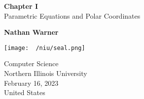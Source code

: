 \documentclass{report}
\title{\Huge{}}
\author{\huge{Nathan Warner}}
\date{\huge{}}
\begin{document}
        \begin{titlepage}
       \begin{center}
           \vspace*{1cm}
    
           \textbf{Chapter I} \\
           Parametric Equations and Polar Coordinates
    
           \vspace{0.5cm}
            
                
           \vspace{1.5cm}
    
           \textbf{Nathan Warner}
    
           \vfill
                
                
           \vspace{0.8cm}
         
           \texttt{[image: ~/niu/seal.png]}
                
           Computer Science \\
           Northern Illinois University\\
           February 16, 2023 \\
           United States\\
           
                
       \end{center}
    \end{titlepage}
    \tableofcontents
    \pagebreak \bigbreak \noindent 
\end{document}
